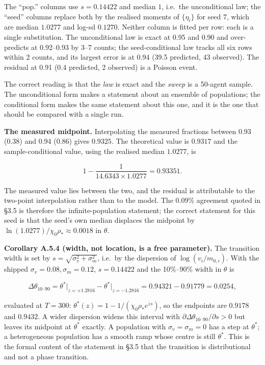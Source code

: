 \documentclass[11pt,a4paper]{article}
\begin{document}
The ``pop.'' columns use \(s=0.14422\) and median \(1\), i.e.~the unconditional law; the
``seed'' columns replace both by the realised moments of \(\{\eta_i\}\) for seed 7,
which are median \(1.0277\) and log-sd \(0.1270\). Neither column is fitted per row:
each is a single substitution. The unconditional law is exact at 0.95 and 0.90 and
over-predicts at 0.92--0.93 by 3--7 counts; the seed-conditional law tracks all six
rows within 2 counts, and its largest error is at 0.94 (39.5 predicted, 43
observed). The residual at 0.91 (0.4 predicted, 2 observed) is a Poisson event.

The correct reading is that the \emph{law} is exact and the \emph{sweep} is a 50-agent
sample. The unconditional form makes a statement about an ensemble of populations;
the conditional form makes the same statement about this one, and it is the one
that should be compared with a single run.

\textbf{The measured midpoint.} Interpolating the measured fractions between 0.93
(0.38) and 0.94 (0.86) gives \(0.9325\). The theoretical value is \(0.9317\) and the
sample-conditional value, using the realised median \(1.0277\), is

\[
1-\frac{1}{14.6343\times1.0277}=0.93351 .
\]

The measured value lies between the two, and the residual is attributable to the
two-point interpolation rather than to the model. The \(0.09\%\) agreement quoted in
§3.5 is therefore the infinite-population statement; the correct statement for
this seed is that the seed's own median displaces the midpoint by
\(\ln(1.0277)/\chi_0\rho_\ast\approx0.0018\) in \(\theta\).

\textbf{Corollary A.5.4 (width, not location, is a free parameter).} The transition
width is set by \(s=\sqrt{\sigma_v^2+\sigma_m^2}\), i.e.~by the dispersion of
\(\log(v_i/m_{0,i})\). With the shipped \(\sigma_v=0.08,\sigma_m=0.12\), \(s=0.14422\)
and the 10\%--90\% width in \(\theta\) is

\[
\Delta\theta_{10\text{–}90}
=\theta^\ast\big|_{z=+1.2816}-\theta^\ast\big|_{z=-1.2816}
=0.94321-0.91779
=0.0254 ,
\]

evaluated at \(T=300\): \(\theta^\ast(z)=1-1/(\chi_0\rho_\ast e^{zs})\), so the endpoints
are \(0.9178\) and \(0.9432\). A wider dispersion widens this interval with
\(\partial\Delta\theta_{10\text{–}90}/\partial s>0\) but leaves its midpoint at
\(\theta^\ast\) exactly. A population with \(\sigma_v=\sigma_m=0\) has a step at
\(\theta^\ast\); a heterogeneous population has a smooth ramp whose centre is still
\(\theta^\ast\). This is the formal content of the statement in §3.5 that the
transition is distributional and not a phase transition.
\end{document}
